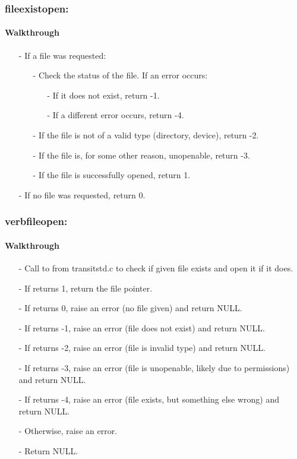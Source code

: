 \documentclass[letterpaper,12pt]{article}
\begin{document}
\subsubsection{fileexistopen:}
\paragraph{Walkthrough}
\begin{enumerate}[leftmargin=10pt, noitemsep, parsep=0pt, topsep=0ex]
\item[-] If a file was requested:
\begin{enumerate}[leftmargin=10pt, noitemsep, parsep=0pt, topsep=0ex]
\item[-] Check the status of the file. If an error occurs:
\begin{enumerate}[leftmargin=10pt, noitemsep, parsep=0pt, topsep=0ex]
\item[-] If it does not exist, return -1.
\item[-] If a different error occurs, return -4.
\end{enumerate}
\item[-] If the file is not of a valid type (directory, device), return -2.
\item[-] If the file is, for some other reason, unopenable, return -3.
\item[-] If the file is successfully opened, return 1.
\end{enumerate}
\item[-] If no file was requested, return 0.
\end{enumerate}

\subsubsection{verbfileopen:}
\paragraph{Walkthrough}
\begin{enumerate}[leftmargin=10pt, noitemsep, parsep=0pt, topsep=0ex]
\item[-] Call to  from transitstd.c to check if given file exists and open it if it does.
\item[-] If  returns 1, return the file pointer.
\item[-] If  returns 0, raise an error (no file given) and return NULL.
\item[-] If  returns -1, raise an error (file does not exist) and return NULL.
\item[-] If  returns -2, raise an error (file is invalid type) and return NULL.
\item[-] If  returns -3, raise an error (file is unopenable, likely due to permissions) and return NULL.
\item[-] If  returns -4, raise an error (file exists, but something else wrong) and return NULL.
\item[-] Otherwise, raise an error.
\item[-] Return NULL.
\end{enumerate}
\end{document}
